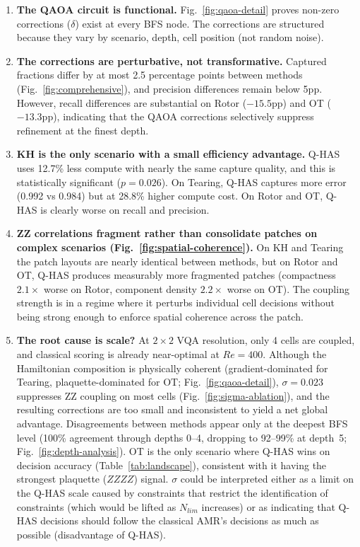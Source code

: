\documentclass[12pt, a4paper, oneside]{report}
\begin{document}
\begin{enumerate}
    \item \textbf{The QAOA circuit is functional.} Fig.~\ref{fig:qaoa-detail} proves non-zero corrections ($\delta$) exist at every BFS node. The corrections are structured because they vary by scenario, depth, cell position (not random noise).

    \item \textbf{The corrections are perturbative, not transformative.} Captured fractions differ by at most 2.5 percentage points between methods (Fig.~\ref{fig:comprehensive}), and precision differences remain below 5pp.  However, recall differences are substantial on Rotor ($-15.5$pp) and OT ($-13.3$pp), indicating that the QAOA corrections selectively suppress refinement at the finest depth.

    \item \textbf{KH is the only scenario with a small efficiency advantage.} Q-HAS uses 12.7\% less compute with nearly the same capture quality, and this is statistically significant ($p = 0.026$). On Tearing, Q-HAS captures more error (0.992 vs 0.984) but at 28.8\% higher compute cost. On Rotor and OT, Q-HAS is clearly worse on recall and precision.

    \item \textbf{ZZ correlations fragment rather than consolidate patches on complex scenarios (Fig.~\ref{fig:spatial-coherence}).} On KH and Tearing the patch layouts are nearly identical between methods, but on Rotor and OT, Q-HAS produces measurably more fragmented patches (compactness $2.1\times$ worse on Rotor, component density $2.2\times$ worse on OT).  The coupling strength is in a regime where it perturbs individual cell decisions without being strong enough to enforce spatial coherence across the patch.

    \item \textbf{The root cause is scale?} At $2\times 2$ VQA resolution, only 4 cells are coupled, and classical scoring is already near-optimal at $Re = 400$.  Although the Hamiltonian composition is physically coherent (gradient-dominated for Tearing, plaquette-dominated for OT; Fig.~\ref{fig:qaoa-detail}), $\sigma = 0.023$ suppresses ZZ coupling on most cells (Fig.~\ref{fig:sigma-ablation}), and the resulting corrections are too small and inconsistent to yield a net global advantage.  Disagreements between methods appear only at the deepest BFS level (100\% agreement through depths 0--4, dropping to 92--99\% at depth~5; Fig.~\ref{fig:depth-analysis}).  OT is the only scenario where Q-HAS wins on decision accuracy (Table~\ref{tab:landscape}), consistent with it having the strongest plaquette ($ZZZZ$) signal. $\sigma$ could be interpreted either as a limit on the Q-HAS scale caused by constraints that restrict the identification of constraints (which would be lifted as $N_{lim}$ increases) or as indicating that Q-HAS decisions should follow the classical AMR's decisions as much as possible (disadvantage of Q-HAS).  


\end{enumerate}
\end{document}
